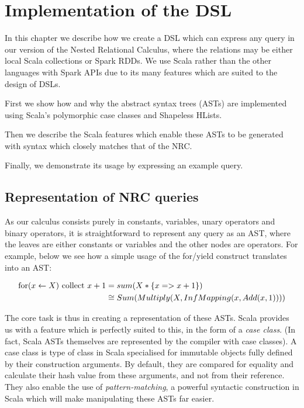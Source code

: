 \chapter{Implementation of the DSL} \label{dsl}

In this chapter we describe how we create a DSL which can express any query in our version of the Nested Relational Calculus, where the relations may be either local Scala collections or Spark RDDs. We use Scala rather than the other languages with Spark APIs due to its many features which are suited to the design of DSLs.

First we show how and why the abstract syntax trees (ASTs) are implemented using Scala's polymorphic case classes and Shapeless HLists.

Then we describe the Scala features which enable these ASTs to be generated with syntax which closely matches that of the NRC.

Finally, we demonstrate its usage by expressing an example query.


\section{Representation of NRC queries}

As our calculus consists purely in constants, variables, unary operators and binary operators, it is straightforward to represent any query as an AST, where the leaves are either constants or variables and the other nodes are operators. For example, below we see how a simple usage of the for/yield construct translates into an AST:

\begin{equation*}
\begin{split}
\textrm{for}(x \leftarrow X) \textrm{ collect } x + 1 &= sum(X*\{x => x + 1\}) \\
&\cong Sum(Multiply(X,InfMapping(x,Add(x,1))))
\end{split}
\end{equation*}

The core task is thus in creating a representation of these ASTs. Scala provides us with a feature which is perfectly suited to this, in the form of a \textit{case class}. (In fact, Scala ASTs themselves are represented by the compiler with case classes). A case class is type of class in Scala specialised for immutable objects fully defined by their construction arguments. By default, they are compared for equality and calculate their hash value from these arguments, and not from their reference. They also enable the use of \textit{pattern-matching}, a powerful syntactic construction in Scala which will make manipulating these ASTs far easier.

